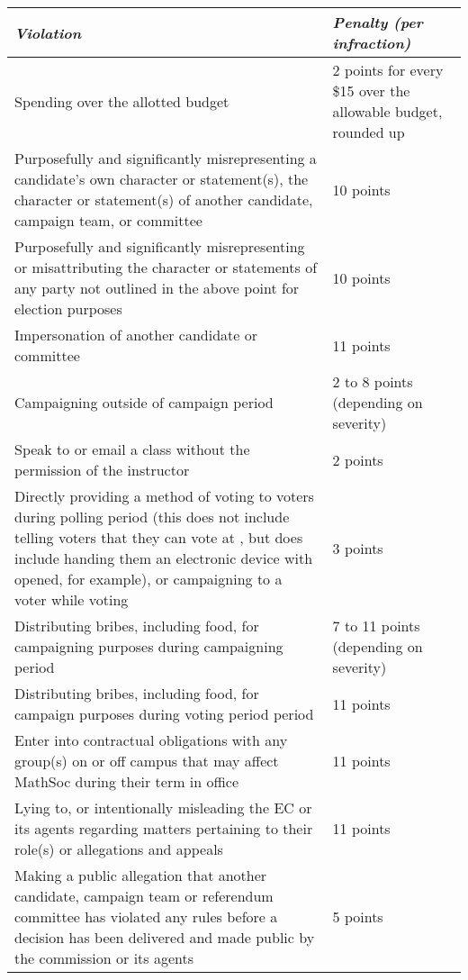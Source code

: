 \begin{center}
	\begin{tabular}{| p{11.5cm} | p{4cm} |}
		\hline
		\rowcolor{lightgray} \textit{\textbf{Violation}} & \textit{\textbf{Penalty (per infraction)}}  \\ 
		\hline
		Spending over the allotted budget & 2 points for every \$15 over the allowable budget, rounded up\\  
		\hline
		Purposefully and significantly misrepresenting a candidate’s own character or statement(s), the character or statement(s) of another candidate, campaign team, or committee & 10 points \\
		\hline
		Purposefully and significantly misrepresenting or misattributing the character or statements of any party not outlined in the above point for election purposes & 10 points \\
		\hline 
		Impersonation of another candidate or committee & 11 points \\
		\hline
		Campaigning outside of campaign period & 2 to 8 points (depending on severity) \\
		\hline
		Speak to or email a class without the permission of the instructor & 2 points \\
		\hline
		Directly providing a method of voting to voters during polling period (this does not include telling voters that they can vote at \votewebsite, but does include handing them an electronic device with \votewebsite{} opened, for example), or campaigning to a voter while voting & 3 points \\
		\hline
		Distributing bribes, including food, for campaigning purposes during campaigning period & 7 to 11 points (depending on severity) \\
		\hline
		Distributing bribes, including food, for campaign purposes during voting period period & 11 points \\
		\hline
		Enter into contractual obligations with any group(s) on or off campus that may affect MathSoc during their term in office & 11 points \\
		\hline 
		Lying to, or intentionally misleading the EC or its agents regarding matters pertaining to their role(s) or allegations and appeals & 11 points \\
		\hline
		Making a public allegation that another candidate, campaign team or referendum committee has violated any rules before a decision has been delivered and made public by the commission or its agents & 5 points \\

\end{tabular}
\end{center}
